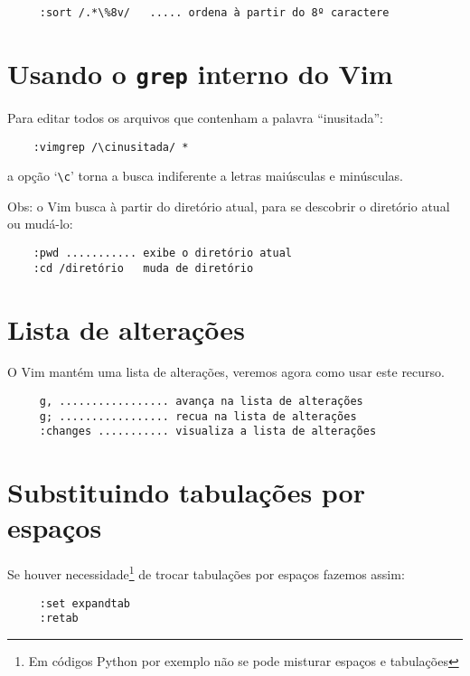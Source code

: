\begin{verbatim}
     :sort /.*\%8v/   ..... ordena à partir do 8º caractere
\end{verbatim}

\section{Usando o \texttt{grep} interno do Vim}
\label{sec:Usando o grep interno do Vim}

Para editar todos os arquivos que contenham a palavra ``inusitada'':

\begin{verbatim}
    :vimgrep /\cinusitada/ *
\end{verbatim}
a opção `\verb|\c|' torna a busca indiferente a letras maiúsculas e minúsculas.

Obs: o Vim busca à partir do diretório atual, para se descobrir 
o diretório atual ou mudá-lo:

\begin{verbatim}
    :pwd ........... exibe o diretório atual
    :cd /diretório   muda de diretório
\end{verbatim}

\section{Lista de alterações}

O Vim mantém uma lista de alterações, veremos agora como usar este recurso.

\begin{verbatim}
     g, ................. avança na lista de alterações
     g; ................. recua na lista de alterações
     :changes ........... visualiza a lista de alterações
\end{verbatim}

\section{Substituindo tabulações por espaços}
\label{sec:Substituindo tabulações por espaços}

Se houver necessidade\footnote{Em códigos Python por exemplo não se pode
misturar espaços e tabulações} de trocar tabulações por espaços
fazemos assim:

\begin{verbatim}
	 :set expandtab
	 :retab
\end{verbatim}

